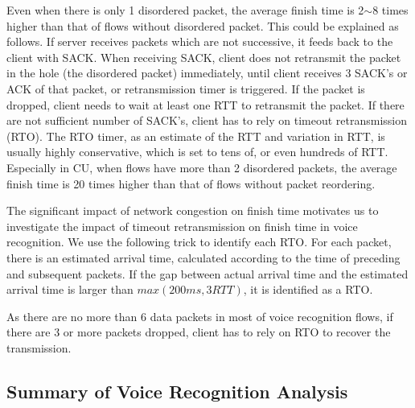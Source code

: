 Even when there is only 1 disordered packet, the average finish time is 2$\sim$8 times higher than that of flows without disordered packet. This could be explained as follows. If server receives packets which are not successive, it feeds back to the client with SACK. When receiving SACK, client does not retransmit the packet in the hole (\ie the disordered packet) immediately, until client receives 3 SACK's or ACK of that packet, or retransmission timer is triggered. If the packet is dropped, client needs to wait at least one RTT to retransmit the packet. If there are not sufficient number of SACK's, client has to rely on timeout retransmission (RTO). The RTO timer, as an estimate of the RTT and variation in RTT, is usually highly conservative, which is set to tens of, or even hundreds of RTT. Especially in CU, when flows have more than 2 disordered packets, the average finish time is 20 times higher than that of flows without packet reordering.

The significant impact of network congestion on finish time motivates us to investigate the impact of timeout retransmission on finish time in voice recognition. We use the following trick to identify each RTO. For each packet, there is an estimated arrival time, calculated according to the time of preceding and subsequent packets. If the gap between actual arrival time and the estimated arrival time is larger than $max(200ms, 3 RTT)$, it is identified as a RTO.

As there are no more than 6 data packets in most of voice recognition flows, if there are 3 or more packets dropped, client has to rely on RTO to recover the transmission. 


\subsection{Summary of Voice Recognition Analysis}